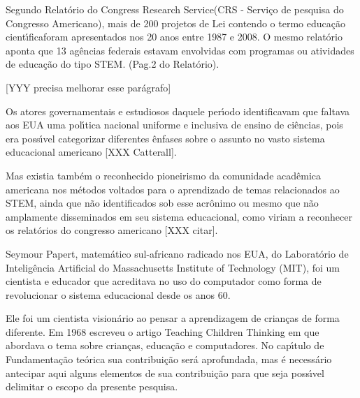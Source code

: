 \documentclass[
12pt,		%
openright,	%
twoside,  %
a4paper,			%
chapter=TITLE,		%
english,			%
french,				%
spanish,			%
brazil				%
]{USPSC-classe/USPSC}
\begin{document}
Segundo Relat\'orio do \textquotedbl Congress Research Service\textquotedbl  (CRS - Servi\c{c}o de pesquisa do Congresso Americano), mais de 200 projetos de Lei contendo o termo \textquotedbl educa\c{c}\~ao cient\'{\i}fica\textquotedbl  foram apresentados nos 20 anos entre 1987 e 2008. O mesmo relat\'orio aponta que 13 ag\^encias federais estavam envolvidas com programas ou atividades de educa\c{c}\~ao do tipo \textquotedbl STEM\textquotedbl . (Pag.2 do Relat\'orio).










[YYY precisa melhorar esse par\'agrafo]










Os atores governamentais e estudiosos daquele per\'{\i}odo identificavam que faltava aos EUA uma pol\'{\i}tica nacional uniforme e inclusiva de ensino de ci\^encias, pois era poss\'{\i}vel categorizar diferentes \^enfases sobre o assunto no vasto sistema educacional americano [XXX Catterall].










Mas existia tamb\'em o reconhecido pioneirismo da comunidade acad\^emica americana nos m\'etodos voltados para o aprendizado de temas relacionados ao STEM, ainda que n\~ao identificados sob esse acr\^onimo ou mesmo que n\~ao amplamente disseminados em seu sistema educacional, como viriam a reconhecer os relat\'orios do congresso americano [XXX citar]. 










Seymour Papert, matem\'atico sul-africano radicado nos EUA, do Laborat\'orio de Intelig\^encia Artificial do Massachusetts Institute of Technology (MIT), foi um  cientista e educador que acreditava  no  uso do computador como forma de revolucionar o sistema  educacional  desde os anos 60.










Ele foi um cientista vision\'ario ao pensar a aprendizagem de crian\c{c}as de forma diferente. Em 1968 escreveu o artigo \textquotedbl  Teaching Children Thinking \textquotedbl   em que abordava  o tema sobre crian\c{c}as, educa\c{c}\~ao e computadores. No cap\'{\i}tulo de Fundamenta\c{c}\~ao te\'orica sua contribui\c{c}\~ao ser\'a aprofundada, mas \'e necess\'ario antecipar aqui alguns elementos de sua contribui\c{c}\~ao para que seja poss\'{\i}vel delimitar o escopo da presente pesquisa.
\end{document}

